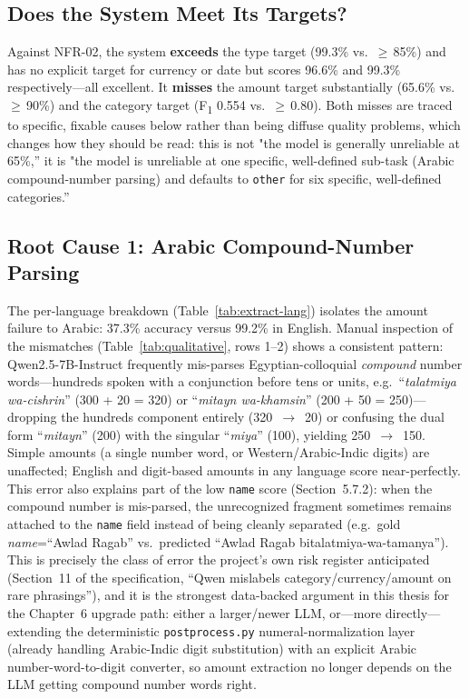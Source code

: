 \subsection{Does the System Meet Its Targets?}

Against NFR-02, the system \textbf{exceeds} the type target (99.3\% vs.\
$\geq$\,85\%) and has no explicit target for currency or date but scores 96.6\%
and 99.3\% respectively---all excellent. It \textbf{misses} the amount target
substantially (65.6\% vs.\ $\geq$\,90\%) and the category target
(F\textsubscript{1} 0.554 vs.\ $\geq$\,0.80). Both misses are traced to
specific, fixable causes below rather than being diffuse quality problems,
which changes how they should be read: this is not "the model is generally
unreliable at 65\%,'' it is "the model is unreliable at one specific,
well-defined sub-task (Arabic compound-number parsing) and defaults to
\texttt{other} for six specific, well-defined categories.''

\subsection{Root Cause 1: Arabic Compound-Number Parsing}

The per-language breakdown (Table~\ref{tab:extract-lang}) isolates the amount
failure to Arabic: 37.3\% accuracy versus 99.2\% in English. Manual inspection
of the mismatches (Table~\ref{tab:qualitative}, rows 1--2) shows a consistent
pattern: Qwen2.5-7B-Instruct frequently mis-parses Egyptian-colloquial
\emph{compound} number words---hundreds spoken with a conjunction before tens or
units, e.g.\ ``\emph{talatmiya wa-cishrin}'' (300 + 20 = 320) or ``\emph{mitayn
wa-khamsin}'' (200 + 50 = 250)---dropping the hundreds component entirely
(320~$\rightarrow$~20) or confusing the dual form ``\emph{mitayn}'' (200) with
the singular ``\emph{miya}'' (100), yielding 250~$\rightarrow$~150. Simple
amounts (a single number word, or Western/Arabic-Indic digits) are unaffected;
English and digit-based amounts in any language score near-perfectly. This
error also explains part of the low \texttt{name} score (Section~5.7.2): when
the compound number is mis-parsed, the unrecognized fragment sometimes remains
attached to the \texttt{name} field instead of being cleanly separated (e.g.\
gold \emph{name}=``Awlad Ragab'' vs.\ predicted ``Awlad Ragab
bitalatmiya-wa-tamanya''). This is precisely the class of error the project's
own risk register anticipated (Section~11 of the specification, ``Qwen
mislabels category/currency/amount on rare phrasings''), and it is the strongest
data-backed argument in this thesis for the Chapter~6 upgrade path: either a
larger/newer LLM, or---more directly---extending the deterministic
\texttt{postprocess.py} numeral-normalization layer (already handling
Arabic-Indic digit substitution) with an explicit Arabic
number-word-to-digit converter, so amount extraction no longer depends on the
LLM getting compound number words right.

